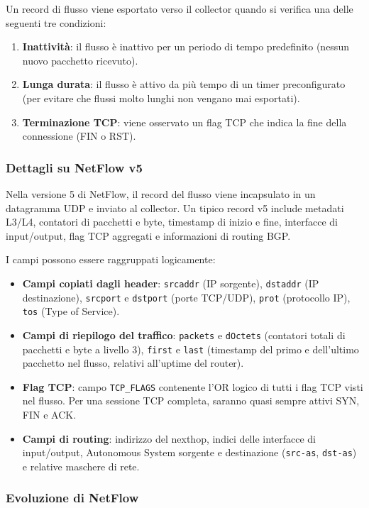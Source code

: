 Un record di flusso viene esportato verso il collector quando si verifica
una delle seguenti tre condizioni:
\begin{enumerate}
\item \textbf{Inattività}: il flusso è inattivo per un periodo di tempo
predefinito (nessun nuovo pacchetto ricevuto).
\item \textbf{Lunga durata}: il flusso è attivo da più tempo di un timer
preconfigurato (per evitare che flussi molto lunghi non vengano mai esportati).
\item \textbf{Terminazione TCP}: viene osservato un flag TCP che indica la
fine della connessione (FIN o RST).
\end{enumerate}

\subsubsection{Dettagli su NetFlow v5}

Nella versione 5 di NetFlow, il record del flusso viene incapsulato in un
datagramma UDP e inviato al collector. Un tipico record v5 include metadati
L3/L4, contatori di pacchetti e byte, timestamp di inizio e fine, interfacce
di input/output, flag TCP aggregati e informazioni di routing BGP.

I campi possono essere raggruppati logicamente:
\begin{itemize}
\item \textbf{Campi copiati dagli header}: \texttt{srcaddr} (IP sorgente),
\texttt{dstaddr} (IP destinazione), \texttt{srcport} e \texttt{dstport}
(porte TCP/UDP), \texttt{prot} (protocollo IP), \texttt{tos}
(Type of Service).
\item \textbf{Campi di riepilogo del traffico}: \texttt{packets} e
\texttt{dOctets} (contatori totali di pacchetti e byte a livello 3),
\texttt{first} e \texttt{last} (timestamp del primo e dell'ultimo pacchetto
nel flusso, relativi all'uptime del router).
\item \textbf{Flag TCP}: campo \texttt{TCP\_FLAGS} contenente l'OR logico
di tutti i flag TCP visti nel flusso. Per una sessione TCP completa,
saranno quasi sempre attivi SYN, FIN e ACK.
\item \textbf{Campi di routing}: indirizzo del nexthop, indici delle
interfacce di input/output, Autonomous System sorgente e destinazione
(\texttt{src-as}, \texttt{dst-as}) e relative maschere di rete.
\end{itemize}

\subsubsection{Evoluzione di NetFlow}

